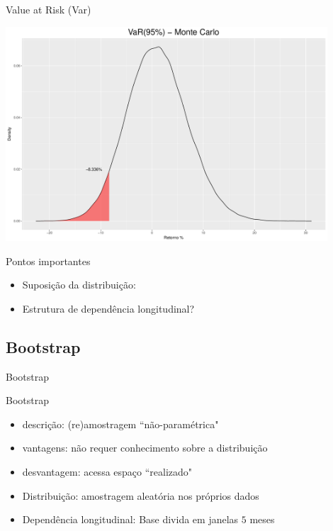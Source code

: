 \documentclass{beamer}
\begin{document}
\begin{frame}{Value at Risk (Var)}

\begin{center}
 \includegraphics[height=8cm,keepaspectratio]{VAR_mc.pdf}
 \end{center}
 
\end{frame}

\begin{frame}{Pontos importantes}
\begin{itemize}
\item Suposição da distribuição:
\item Estrutura de dependência longitudinal?
\end{itemize}
\end{frame}

\subsection{Bootstrap}

\begin{frame}{ }
    \begin{block}{ }
      \Huge  Bootstrap
    \end{block}
\end{frame}



\begin{frame}{ Bootstrap}


\begin{itemize}
\item descrição: (re)amostragem ``não-paramétrica"
\item vantagens: não requer conhecimento sobre a distribuição
\item desvantagem: acessa espaço ``realizado"
\end{itemize}

\pause

\begin{itemize}
\item Distribuição: amostragem aleatória nos próprios dados
\item Dependência longitudinal: Base divida em janelas $5$ meses
\end{itemize}
 
\end{frame}
\end{document}
